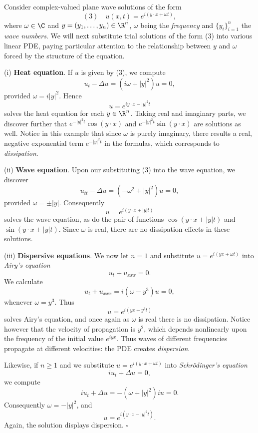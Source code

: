 \begin{example}
\label{ex:exponential-plane-wave-solutions}
Consider complex-valued plane wave solutions of the form
$$(3) \quad u(x,t) = e^{i(y \cdot x + \omega t)},$$
where $\omega \in \C$ and $y = (y_1,\ldots,y_n) \in \R^n$, $\omega$ being the \textit{frequency} and $\{y_i\}_{i=1}^n$ the \textit{wave numbers}. We will next substitute trial solutions of the form (3) into various linear PDE, paying particular attention to the relationship between $y$ and $\omega$ forced by the structure of the equation.

(i) \textbf{Heat equation}. If $u$ is given by (3), we compute
$$u_t - \Delta u = (i\omega + |y|^2)u = 0,$$
provided $\omega = i|y|^2$. Hence
$$u = e^{iy \cdot x - |y|^2 t}$$
solves the heat equation for each $y \in \R^n$. Taking real and imaginary parts, we discover further that $e^{-|y|^2 t}\cos(y \cdot x)$ and $e^{-|y|^2 t}\sin(y \cdot x)$ are solutions as well. Notice in this example that since $\omega$ is purely imaginary, there results a real, negative exponential term $e^{-|y|^{2}t}$ in the formulas, which corresponds to \textit{dissipation}.

(ii) \textbf{Wave equation}. Upon our substituting (3) into the wave equation, we discover
$$u_{tt} - \Delta u = (-\omega^2 + |y|^2)u = 0,$$
provided $\omega = \pm|y|$. Consequently
$$u = e^{i(y \cdot x \pm |y|t)}$$
solves the wave equation, as do the pair of functions $\cos(y \cdot x \pm |y|t)$ and $\sin(y \cdot x \pm |y|t)$. Since $\omega$ is real, there are no dissipation effects in these solutions.

(iii) \textbf{Dispersive equations}. We now let $n = 1$ and substitute $u = e^{i(yx+\omega t)}$ into \textit{Airy's equation}
$$u_t + u_{xxx} = 0.$$
We calculate
$$u_t + u_{xxx} = i(\omega - y^3)u = 0,$$
whenever $\omega = y^3$. Thus
$$u = e^{i(yx+y^3t)}$$
solves Airy's equation, and once again as $\omega$ is real there is no dissipation. Notice however that the velocity of propagation is $y^2$, which depends nonlinearly upon the frequency of the initial value $e^{iyx}$. Thus waves of different frequencies propagate at different velocities: the PDE creates \textit{dispersion}.

Likewise, if $n \geq 1$ and we substitute $u = e^{i(y \cdot x + \omega t)}$ into \textit{Schr\"odinger's equation}
$$iu_t + \Delta u = 0,$$
we compute
$$iu_t + \Delta u = -(\omega + |y|^2)iu = 0.$$
Consequently $\omega = -|y|^2$, and
$$u = e^{i(y \cdot x - |y|^2 t)}.$$
Again, the solution displays dispersion. $\square$
\end{example}

